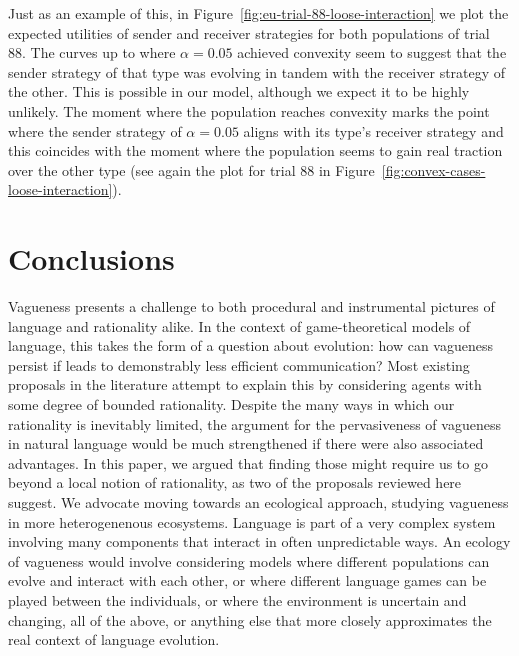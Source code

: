 \documentclass[a4paper]{article}
\begin{document}
Just as an example of this, in Figure~\ref{fig:eu-trial-88-loose-interaction} we plot the expected utilities of sender and receiver strategies for both populations of trial 88.
The curves up to where $\alpha = 0.05$ achieved convexity seem to suggest that the sender strategy of that type was evolving in tandem with the receiver strategy of the other.
This is possible in our model, although we expect it to be highly unlikely.
The moment where the population reaches convexity marks the point where the sender strategy of $\alpha = 0.05$ aligns with its type's receiver strategy and this coincides with the moment where the population seems to gain real traction over the other type (see again the plot for trial 88 in Figure~\ref{fig:convex-cases-loose-interaction}).


\section{Conclusions}
\label{sec:conclusions}
Vagueness presents a challenge to both procedural and instrumental pictures of language and rationality alike.
In the context of game-theoretical models of language, this takes the form of a question about evolution: how can vagueness persist if leads to demonstrably less efficient communication?
Most existing proposals in the literature attempt to explain this by considering agents with some degree of bounded rationality.
Despite the many ways in which our rationality is inevitably limited, the argument for the pervasiveness of vagueness in natural language would be much strengthened if there were also associated advantages.
In this paper, we argued that finding those might require us to go beyond a local notion of rationality, as two of the proposals reviewed here~\parencite{oconnor_evolution_2014, franke_vagueness_2017} suggest.
We advocate moving towards an ecological approach, studying vagueness in more heterogenenous ecosystems.
Language is part of a very complex system~\parencite{beckner_language_2009} involving many components that interact in often unpredictable ways.
An ecology of vagueness would involve considering models where different populations can evolve and interact with each other, or where different language games can be played between the individuals, or where the environment is uncertain and changing, all of the above, or anything else that more closely approximates the real context of language evolution.
\end{document}
